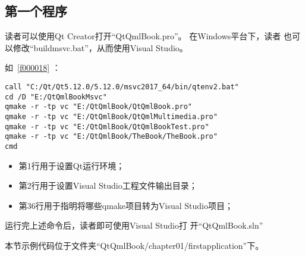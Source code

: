 ﻿




%

\FloatBarrier
\subsection{
第一个程序
}\label{s100210}



读者可以使用Qt Creator打开“QtQmlBook.pro”。
在Windows平台下，读者
也可以修改“build\underline{\hspace{0.5em}}msvc.bat”，从而使用Visual Studio。

如\lstlistingname\ \ref{f000018} ：


\begin{lstlisting}[label=f000018,
caption=GoodLuck,
title=\lstlistingname\ \thelstlisting
]
call "C:/Qt/Qt5.12.0/5.12.0/msvc2017_64/bin/qtenv2.bat"
cd /D "E:/QtQmlBookMsvc"
qmake -r -tp vc "E:/QtQmlBook/QtQmlBook.pro"
qmake -r -tp vc "E:/QtQmlBook/QtQmlMultimedia.pro"
qmake -r -tp vc "E:/QtQmlBook/QtQmlBookTest.pro"
qmake -r -tp vc "E:/QtQmlBook/TheBook/TheBook.pro"
cmd
\end{lstlisting}          %



\begin{itemize}

\item 第1行用于设置Qt运行环境；
\item 第2行用于设置Visual Studio工程文件输出目录；
\item 第3\raisebox{0.16ex}{\sourcefonttwo\~{}}6行用于指明将哪些qmake项目转为Visual Studio项目；

\end{itemize}

运行完上述命令后，读者即可使用Visual Studio打
开“QtQmlBook.sln”

本节示例代码位于文件夹“QtQmlBook/chapter01/firstapplication”下。


